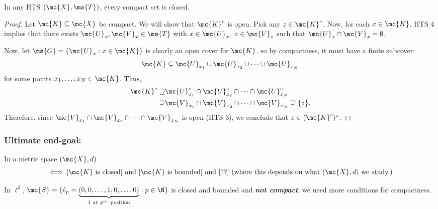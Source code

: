 \begin{nproposition}{}
	In any HTS \((\mc{X},\ms{T})\), every compact set is closed.
\end{nproposition}
\begin{proof}
	Let \(\mc{K}\subseteq\mc{X}\) be compact. We will show that \(\mc{K}^c\) is open. Pick any \(z\in\mc{K}^c\). Now, for each \(x\in\mc{K}\), HTS 4 implies that there exists \(\mc{U}_x,\mc{V}_x\in\ms{T}\) with \(x
	\in\mc{U}_x\), \(z\in\mc{V}_x\) such that \(\mc{U}_x\cap\mc{V}_x=\emptyset\).
	
	\smallskip
	
	Now, let \(\ms{G}=\{\mc{U}_x:x\in\mc{K}\}\) is clearly an open cover for \(\mc{K}\), so by compactness, it must have a finite subcover:
	\begin{equation*}
		\mc{K}\subseteq\mc{U}_{x_1}\cup\mc{U}_{x_2}\cup\dots\cup\mc{U}_{x_N}
	\end{equation*}
	for some points \(x_1,\dots,x_N\in\mc{K}\). Thus, 
	\begin{align*}
		\mc{K}^c\supseteq& \mc{U}_{x_1}^c\cap\mc{U}_{x_2}^c\cap\dots\cap\mc{U}_{x_N}^c\\
		\supseteq&\mc{V}_{x_1}\cap\mc{V}_{x_2}\cap\dots\cap\mc{V}_{x_N}\supseteq\{z\}.
	\end{align*} 
	Therefore, since \(\mc{V}_{x_1}\cap\mc{V}_{x_2}\cap\dots\cap\mc{V}_{x_N}\) is open (HTS 3), we conclude that \(z\in(\mc{K}^c)^{\circ}\).
\end{proof}

\subsubsection{Ultimate end-goal:}
In a metric space \((\mc{X},d)\)
\begin{equation*}
	[\mc{K}~\text{is compact}]\iff [\mc{K}~\text{is closed}]~\text{and}~[\mc{K}~\text{is bounded}]~\text{and}~[??]~(\text{where this depends on what \((\mc{X},d)\) we study.})
\end{equation*}
\begin{note}
	In \(\ell^2\), \(\mc{S}=\{\hat{e}_p=\underbrace{(0,0,\dots,1,0,\dots,0)}_{1~\text{at}~p^{\text{th}}~\text{position}}:p\in\N\}\) is closed and bounded and \emph{\textbf{not compact}}; we need more conditions for compactness.
\end{note}

